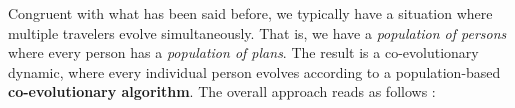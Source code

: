 
Congruent with what has been said before, we typically have a
situation where multiple travelers evolve simultaneously.  That is, we
have a \emph{population of persons} where every person has a
\emph{population of plans}.  The result is a co-evolutionary dynamic,
where every individual person evolves according to a population-based
\textbf{co-evolutionary algorithm}.  The overall approach reads as
follows \citep[see, e.g.,][for similar
  approaches]{HraberJonesForrestEcho,ArthurBar}:

